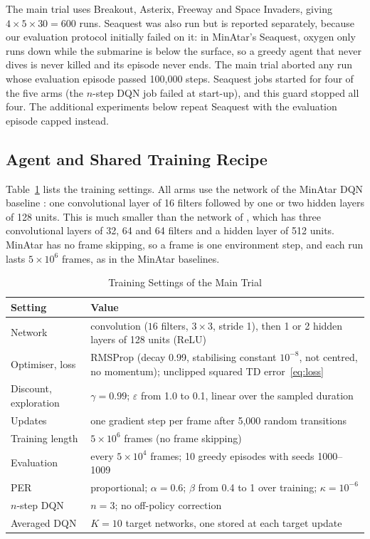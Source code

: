 \documentclass[conference,a4paper]{IEEEtran}
\begin{document}
The main trial uses Breakout, Asterix, Freeway and Space Invaders, giving $4\times5\times30=600$ runs. Seaquest was
also run but is reported separately, because our evaluation protocol initially failed on it: in MinAtar's Seaquest,
oxygen only runs down while the submarine is below the surface, so a greedy agent that never dives is never
killed and its episode never ends. The main trial aborted any run whose evaluation episode passed 100,000 steps.
Seaquest jobs started for four of the five arms (the $n$-step DQN job failed at start-up), and this guard stopped all
four. The additional experiments below repeat Seaquest with the evaluation episode capped instead.

\subsection{Agent and Shared Training Recipe}\label{sec:recipedesc}
Table~\ref{tab:settings} lists the training settings. All arms use the network of the MinAtar DQN
baseline \citep{young2019minatar}: one convolutional layer of 16 filters followed by one or two hidden layers of 128
units. This is much smaller than the network of \citet{mnih2015human}, which has three convolutional layers of 32, 64
and 64 filters and a hidden layer of 512 units. MinAtar has no frame skipping, so a frame is one environment
step, and each run lasts $5\times10^{6}$ frames, as in the MinAtar baselines.

\begin{table}[t]
\caption{Training Settings of the Main Trial}
\label{tab:settings}
\centering
\footnotesize
\begin{tabular}{@{}l>{\raggedright\arraybackslash}p{}@{}}
\toprule
Setting & Value \\
\midrule
Network & convolution ($16$ filters, $3\times3$, stride 1), then 1 or 2 hidden layers of 128 units (ReLU) \\
Optimiser, loss & RMSProp (decay 0.99, stabilising constant $10^{-8}$, not centred, no momentum); unclipped squared TD
error~\eqref{eq:loss} \\
Discount, exploration & $\gamma=0.99$; $\varepsilon$ from 1.0 to 0.1, linear over the sampled duration \\
Updates & one gradient step per frame after 5,000 random transitions \\
Training length & $5\times10^{6}$ frames (no frame skipping) \\
Evaluation & every $5\times10^{4}$ frames; 10 greedy episodes with seeds 1000--1009 \\
\midrule
PER & proportional; $\alpha=0.6$; $\beta$ from 0.4 to 1 over training; $\kappa=10^{-6}$ \\
$n$-step DQN & $n=3$; no off-policy correction \\
Averaged DQN & $K=10$ target networks, one stored at each target update \\
\bottomrule
\end{tabular}
\end{table}
\end{document}
